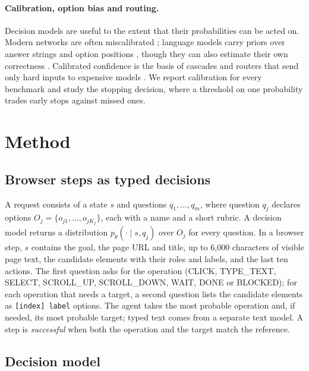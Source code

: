 \documentclass{article}
\begin{document}
\paragraph{Calibration, option bias and routing.}
Decision models are useful to the extent that their probabilities can be acted on. Modern networks are often
miscalibrated \citep{guo2017calibration}; language models carry priors over answer strings \citep{zhao2021calibrate}
and option positions \citep{zheng2024selectors}, though they can also estimate their own correctness
\citep{kadavath2022know}. Calibrated confidence is the basis of cascades and routers that send only hard inputs to
expensive models \citep{chen2023frugalgpt,ong2025routellm,wu2026reflex}. We report calibration for every benchmark and
study the stopping decision, where a threshold on one probability trades early stops against missed ones.

\section{Method}
\label{sec:method}

\subsection{Browser steps as typed decisions}
\label{sec:setting}

A request consists of a state $s$ and questions $q_1,\dots,q_m$, where question $q_j$ declares options
$O_j=\{o_{j1},\dots,o_{jK_j}\}$, each with a name and a short rubric. A decision model returns a distribution
$p_\theta(\cdot\mid s,q_j)$ over $O_j$ for every question. In a browser step, $s$ contains the goal, the page URL and
title, up to 6{,}000 characters of visible page text, the candidate elements with their roles and labels, and the last
ten actions. The first question asks for the operation (CLICK, TYPE\_TEXT, SELECT, SCROLL\_UP, SCROLL\_DOWN, WAIT, DONE
or BLOCKED); for each operation that needs a target, a second question lists the candidate elements as
\texttt{[index] label} options. The agent takes the most probable operation and, if needed, its most probable target;
typed text comes from a separate text model. A step is \emph{successful} when both the operation and the target match
the reference.

\subsection{Decision model}
\label{sec:model}
\end{document}
